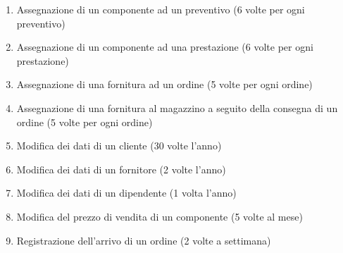 \begin{enumerate}
			\item \label{op:ass_componente_preventivo}Assegnazione di un componente ad un preventivo (6 volte per ogni preventivo)
			\item \label{op:ass_componente_prestazione}Assegnazione di un componente ad una prestazione (6 volte per ogni prestazione)
			\item \label{op:ass_fornitura_ordine}Assegnazione di una fornitura ad un ordine (5 volte per ogni ordine)
			\item \label{op:ass_fornitura_magazzino} Assegnazione di una fornitura al magazzino a seguito della consegna di un ordine (5 volte per ogni ordine)
			
			\item \label{op:edit_cliente}Modifica dei dati di un cliente (30 volte l’anno)
			\item \label{op:edit_fornitore}Modifica dei dati di un fornitore (2 volte l’anno)
			\item \label{op:edit_operatore}Modifica dei dati di un dipendente (1 volta l’anno)
			\item \label{op:edit_componente}Modifica del prezzo di vendita di un componente (5 volte al mese)
			\item \label{op:reg_ordine} Registrazione dell'arrivo di un ordine (2 volte a settimana)
			

\end{enumerate}
